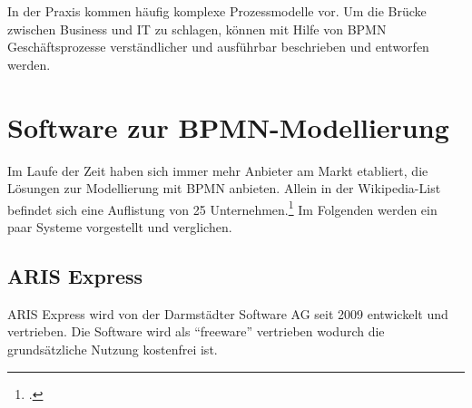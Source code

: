 In der Praxis kommen häufig komplexe Prozessmodelle vor. 
Um die Brücke zwischen Business und IT zu schlagen, 
können mit Hilfe von BPMN Geschäftsprozesse verständlicher und ausführbar 
beschrieben und entworfen werden.\\




\clearpage
\section{Software zur BPMN-Modellierung}

Im Laufe der Zeit haben sich immer mehr Anbieter am Markt etabliert, die
Lösungen zur Modellierung mit BPMN anbieten. Allein in der Wikipedia-List
befindet sich eine Auflistung von 25 Unternehmen.\footcite{wikitools} Im
Folgenden werden ein paar Systeme vorgestellt und verglichen.

\subsection{ARIS Express}

ARIS Express wird von der Darmstädter Software AG seit 2009 entwickelt und
vertrieben. Die Software wird als "`freeware"' vertrieben wodurch die
grundsätzliche Nutzung kostenfrei ist.

\begin{figure}[H]
\begin{minipage}{\linewidth}
\begin{center}
\end{center}
\end{minipage}
\end{figure}



